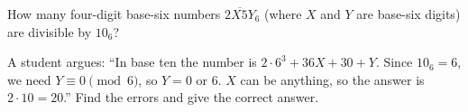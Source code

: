 How many four-digit base-six numbers $\overline{2X5Y}_6$ (where $X$ and $Y$ are base-six digits) are divisible by $10_6$?

A student argues: ``In base ten the number is $2\cdot6^3+36X+30+Y$. Since $10_6=6$, we need $Y\equiv0\pmod6$, so $Y=0$ or $6$. $X$ can be anything, so the answer is $2\cdot10=20$.'' Find the errors and give the correct answer.
